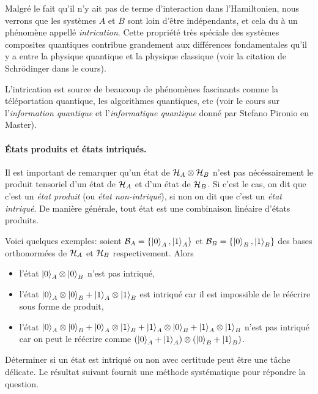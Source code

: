 \documentclass[11pt,a4paper,oneside]{article}
\begin{document}
Malgré le fait qu'il n'y ait pas de terme d'interaction dans l'Hamiltonien, nous verrons que les systèmes $A$ et $B$ sont loin d'être indépendants, et cela du à un phénomène appellé \emph{intrication}. Cette propriété très spéciale des systèmes composites quantiques contribue grandement aux différences fondamentales qu'il y a entre la physique quantique et la physique classique (voir la citation de Schrödinger dans le cours). 

L'intrication est source de beaucoup de phénomènes fascinants comme la téléportation quantique, les algorithmes quantiques, etc (voir le cours sur l'\emph{information quantique} et l'\emph{informatique quantique} donné par Stefano Pironio en Master).

\paragraph*{États produits et états intriqués.} Il est important de remarquer qu'un état de $\mathcal{H}_A\otimes\mathcal{H}_B$ n'est pas nécéssairement le produit tensoriel d'un état de $\mathcal{H}_A$ et d'un état de $\mathcal{H}_B$. Si c'est le cas, on dit que c'est un \emph{état produit} (ou \emph{état non-intriqué}), si non on dit que c'est un \emph{état intriqué}. De manière générale, tout état est une combinaison linéaire d'états produits.

Voici quelques exemples: soient $\mathcal{B}_A=\{\ket{0}_A,\ket{1}_A\}$ et $\mathcal{B}_B=\{\ket{0}_B,\ket{1}_B\}$ des bases orthonormées de $\mathcal{H}_A$ et $\mathcal{H}_B$ respectivement. Alors
\begin{itemize}
    \item l'état $\ket{0}_A\otimes\ket{0}_B$ n'est pas intriqué,
    \item l'état $\ket{0}_A\otimes\ket{0}_B+\ket{1}_A\otimes\ket{1}_B$ est intriqué car il est impossible de le réécrire sous forme de produit,
    \item l'état $\ket{0}_A\otimes\ket{0}_B+\ket{0}_A\otimes\ket{1}_B+\ket{1}_A\otimes\ket{0}_B+\ket{1}_A\otimes\ket{1}_B$ n'est pas intriqué car on peut le réécrire comme $(\ket{0}_A+\ket{1}_A)\otimes(\ket{0}_B+\ket{1}_B)$.
\end{itemize}

Déterminer si un état est intriqué ou non avec certitude peut être une tâche délicate. Le résultat suivant fournit une méthode systématique pour répondre la question.
\end{document}
